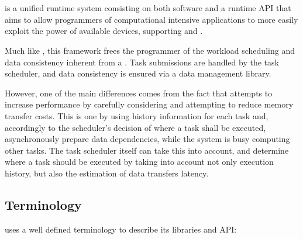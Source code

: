 \documentclass[main.tex]{subfiles}
\begin{document}
\section{\starpu} \label{chapter:starpu}

\starpu \cite{augonnet2011starpu} is a unified runtime system consisting on both software and a runtime API that aims to allow programmers of computational intensive applications to more easily exploit the power of available devices, supporting \cpus and \gpus.

Much like \gama, this framework frees the programmer of the workload scheduling and data consistency inherent from a \hetplat. Task submissions are handled by the \starpu task scheduler, and data consistency is ensured via a data management library.

However, one of the main differences comes from the fact that \starpu attempts to increase performance by carefully considering and attempting to reduce memory transfer costs. This is one by using history information for each task and, accordingly to the scheduler's decision of where a task shall be executed, asynchronously prepare data dependencies, while the system is busy computing other tasks. The task scheduler itself can take this into account, and determine where a task should be executed by taking into account not only execution history, but also the estimation of data transfers latency.

\subsection{Terminology}

\starpu uses a well defined terminology to describe its libraries and API:
\end{document}

